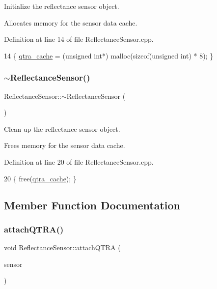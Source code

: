 Initialize the reflectance sensor object. 

Allocates memory for the sensor data cache. 

Definition at line 14 of file Reflectance\+Sensor.\+cpp.


\begin{DoxyCode}
14 \{ \hyperlink{class_reflectance_sensor_ab4b708129419215a57eec3b0af611542}{qtra\_cache} = (\textcolor{keywordtype}{unsigned} \textcolor{keywordtype}{int}*) malloc(\textcolor{keyword}{sizeof}(\textcolor{keywordtype}{unsigned} \textcolor{keywordtype}{int}) * 8); \}
\end{DoxyCode}
\mbox{\label{class_reflectance_sensor_a139165396ee1a7d67b3a1a83a62de85f}} 
\subsubsection{\texorpdfstring{$\sim$\+Reflectance\+Sensor()}{~ReflectanceSensor()}}
{\footnotesize\ttfamily Reflectance\+Sensor\+::$\sim$\+Reflectance\+Sensor (\begin{DoxyParamCaption}{ }\end{DoxyParamCaption})}



Clean up the reflectance sensor object. 

Frees memory for the sensor data cache. 

Definition at line 20 of file Reflectance\+Sensor.\+cpp.


\begin{DoxyCode}
20 \{ free(\hyperlink{class_reflectance_sensor_ab4b708129419215a57eec3b0af611542}{qtra\_cache}); \}
\end{DoxyCode}


\subsection{Member Function Documentation}
\mbox{\label{class_reflectance_sensor_a09c734de7ea4c4f3e7279d1d4c020b5d}} 
\subsubsection{\texorpdfstring{attach\+Q\+T\+R\+A()}{attachQTRA()}}
{\footnotesize\ttfamily void Reflectance\+Sensor\+::attach\+Q\+T\+RA (\begin{DoxyParamCaption}\item[{Q\+T\+R\+Sensors\+Analog $\ast$}]{sensor }\end{DoxyParamCaption})}



